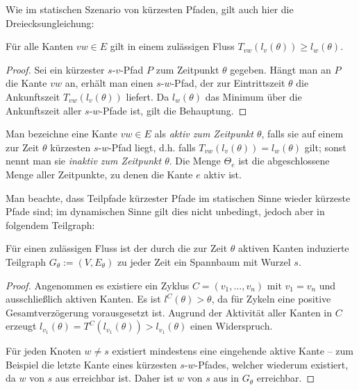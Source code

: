 Wie im statischen Szenario von kürzesten Pfaden, gilt auch hier die Dreiecksungleichung: 

\begin{lemma}\label{lemma-dreicksungl}
	Für alle Kanten $vw\in E$ gilt in einem zulässigen Fluss 
	$T_{vw}(l_v(\theta)) \geq l_w(\theta)$.
\end{lemma}
\begin{proof}
	Sei ein kürzester $s$-$v$-Pfad $P$ zum Zeitpunkt $\theta$ gegeben.
	Hängt man an $P$ die Kante $vw$ an, erhält man einen $s$-$w$-Pfad, der zur Eintrittszeit $\theta$ die Ankunftszeit $T_{vw}(l_v(\theta))$ liefert.
	Da $l_w(\theta)$ das Minimum über die Ankunftszeit aller $s$-$w$-Pfade ist, gilt die Behauptung.
\end{proof}

\begin{definition}
	Man bezeichne eine Kante $vw\in E$ als \emph{aktiv zum Zeitpunkt $\theta$}, falls sie auf einem zur Zeit $\theta$ kürzesten $s$-$w$-Pfad liegt, d.h. falls $T_{vw}(l_v(\theta)) = l_w(\theta)$ gilt; sonst nennt man sie \emph{inaktiv zum Zeitpunkt $\theta$}.
	Die Menge $\Theta_e$ ist die abgeschlossene Menge aller Zeitpunkte, zu denen die Kante $e$ aktiv ist.
\end{definition}

Man beachte, dass Teilpfade kürzester Pfade im statischen Sinne wieder kürzeste Pfade sind; im dynamischen Sinne gilt dies nicht unbedingt, jedoch aber in folgendem Teilgraph:

\begin{lemma}\label{lemma-shortest-path-using-active-edges}
	Für einen zulässigen Fluss ist der durch die zur Zeit $\theta$ aktiven Kanten induzierte Teilgraph $G_\theta:=(V, E_\theta)$ zu jeder Zeit ein Spannbaum mit Wurzel $s$.
\end{lemma}
\begin{proof}
	Angenommen es existiere ein Zyklus $C=(v_1, \dots, v_n)$ mit $v_1=v_n$ und ausschließlich aktiven Kanten.
	Es ist $l^C(\theta) > \theta$, da für Zykeln eine positive Gesamtverzögerung vorausgesetzt ist.
	Augrund der Aktivität aller Kanten in $C$ erzeugt $l_{v_1}(\theta) = T^C(l_{v_1}(\theta)) > l_{v_1}(\theta)$ einen Widerspruch.
	
	Für jeden Knoten $w\neq s$ existiert mindestens eine eingehende aktive Kante -- zum Beispiel die letzte Kante eines kürzesten $s$-$w$-Pfades, welcher wiederum existiert, da $w$ von $s$ aus erreichbar ist.
	Daher ist $w$ von $s$ aus in $G_\theta$ erreichbar.
\end{proof}

